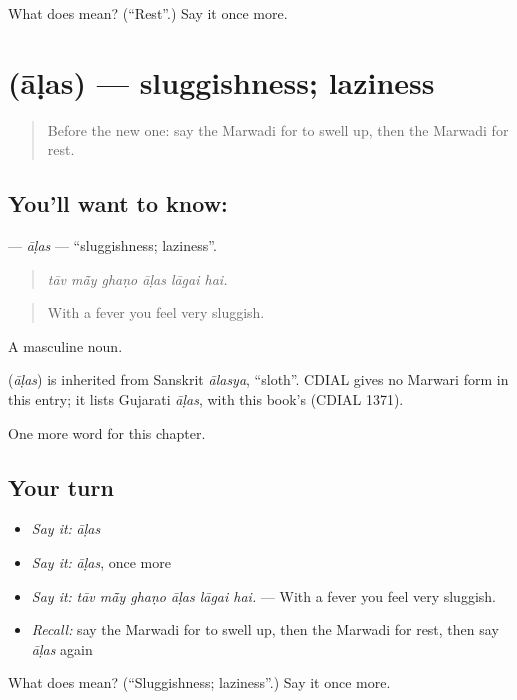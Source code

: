 \begin{tcolorbox}[breakable,colback=teal!4,colframe=teal!35!black,title={Before you move on}]
What does  mean? (\textquotedblleft{}Rest\textquotedblright{}.) Say it once more.
\end{tcolorbox}
\section[\texorpdfstring{\mw{आळस} (āḷas)}{आळस (āḷas)}]{ (āḷas) — sluggishness; laziness}

\label{lesson:MW-C254-alas}



\begin{quote}
Before the new one: say the Marwadi for to swell up, then the Marwadi for rest.
\end{quote}

\subsection*{You'll want to know: }
\textbf{} — \emph{āḷas} — \textquotedblleft{}sluggishness; laziness\textquotedblright{}.

\begin{quote}
     
\end{quote}

\begin{quote}
\emph{tāv mā̃y ghaṇo āḷas lāgai hai.}
\end{quote}

\begin{quote}
With a fever you feel very sluggish.
\end{quote}

A masculine noun.

\begin{cousinweb}
\textbf{} (\emph{āḷas}) is inherited from Sanskrit \emph{ālasya}, \textquotedblleft{}sloth\textquotedblright{}. CDIAL gives no Marwari form in this entry; it lists Gujarati \emph{āḷas}, with this book's  (CDIAL 1371).
\end{cousinweb}

\begin{grammarlens}[title={What you've built}]
One more word for this chapter.
\end{grammarlens}

\subsection*{Your turn}
\begin{itemize}
\raggedright
  \item \emph{Say it:} \emph{āḷas}
  \item \emph{Say it:} \emph{āḷas}, once more
  \item \emph{Say it:} \emph{tāv mā̃y ghaṇo āḷas lāgai hai.} — With a fever you feel very sluggish.
  \item \emph{Recall:} say the Marwadi for to swell up, then the Marwadi for rest, then say \emph{āḷas} again
\end{itemize}

\begin{tcolorbox}[breakable,colback=teal!4,colframe=teal!35!black,title={Before you move on}]
What does  mean? (\textquotedblleft{}Sluggishness; laziness\textquotedblright{}.) Say it once more.
\end{tcolorbox}
